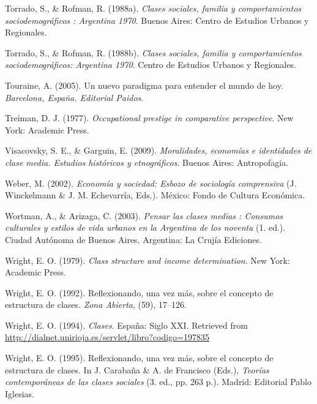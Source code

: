 \documentclass[
]{article}
\newlength{\cslhangindent}
\newlength{\cslentryspacingunit} %
\newenvironment{CSLReferences}[2] %
 {%
  \setlength{\parindent}{0pt}
  \ifodd #1
  \let\oldpar\par
  \def\par{\hangindent=\cslhangindent\oldpar}
  \fi
  \setlength{\parskip}{#2\cslentryspacingunit}
 }%
 {}
\begin{document}
\begin{CSLReferences}{1}{0}
\leavevmode{}%
Torrado, S., \& Rofman, R. (1988a). \emph{Clases sociales, familia y comportamientos sociodemográficos : {Argentina} 1970}. Buenos Aires: Centro de Estudios Urbanos y Regionales.

\leavevmode{}%
Torrado, S., \& Rofman, R. (1988b). \emph{Clases sociales, familia y comportamientos sociodemográficos: {Argentina} 1970}. Centro de Estudios Urbanos y Regionales.

\leavevmode{}%
Touraine, A. (2005). Un nuevo paradigma para entender el mundo de hoy. \emph{Barcelona, España. Editorial Paidos}.

\leavevmode{}%
Treiman, D. J. (1977). \emph{Occupational prestige in comparative perspective}. New York: Academic Press.

\leavevmode{}%
Visacovsky, S. E., \& Garguin, E. (2009). \emph{Moralidades, economías e identidades de clase media. {Estudios} históricos y etnográficos}. Buenos Aires: Antropofagia.

\leavevmode{}%
Weber, M. (2002). \emph{Economía y sociedad: Esbozo de sociología comprensiva} (J. Winckelmann \& J. M. Echevarría, Eds.). México: Fondo de Cultura Económica.

\leavevmode{}%
Wortman, A., \& Arizaga, C. (2003). \emph{Pensar las clases medias : Consumos culturales y estilos de vida urbanos en la {Argentina} de los noventa} (1. ed.). Ciudad Autónoma de Buenos Aires, Argentina: La Crujía Ediciones.

\leavevmode{}%
Wright, E. O. (1979). \emph{Class structure and income determination}. New York: Academic Press.

\leavevmode{}%
Wright, E. O. (1992). Reflexionando, una vez más, sobre el concepto de estructura de clases. \emph{Zona Abierta}, (59), 17--126.

\leavevmode{}%
Wright, E. O. (1994). \emph{Clases}. España: Siglo XXI. Retrieved from \url{http://dialnet.unirioja.es/servlet/libro?codigo=197835}

\leavevmode{}%
Wright, E. O. (1995). Reflexionando, una vez más, sobre el concepto de estructura de clases. In J. Carabaña \& A. de Francisco (Eds.), \emph{Teorías contemporáneas de las clases sociales} (3. ed., pp. 263 p.). Madrid: Editorial Pablo Iglesias.


\end{CSLReferences}
\end{document}
